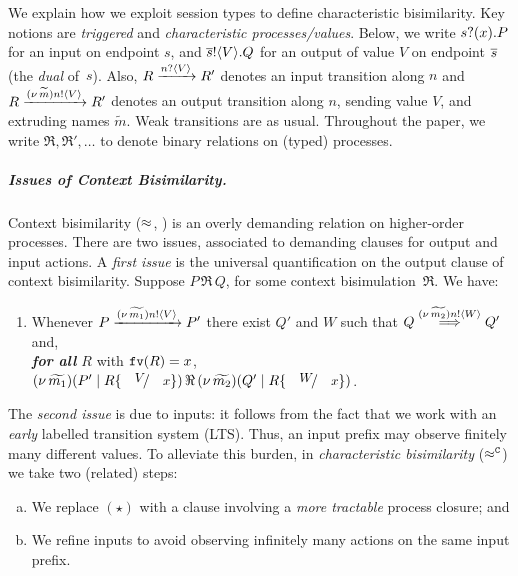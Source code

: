 \documentclass[a4paper,UKenglish]{lipics}
\theoremstyle{definition}
\begin{document}
\smallskip 
We explain how we exploit session types to 
define characteristic bisimilarity.
Key notions are \emph{triggered} and \emph{characteristic processes/values}.
Below, we 
write $s ? (x) .{P}$ 
for an input on %
endpoint $s$, 
and $\overline{s} ! \langle V \rangle . Q$
for an output of value $V$ 
on endpoint $\overline{s}$ (the \emph{dual} of~$s$).
Also, $R \xrightarrow{n ? \langle V \rangle} R'$ denotes an input transition along $n$
and
$R \xrightarrow{(\nu\, \widetilde{m}) n ! \langle V \rangle} R'$
denotes an output transition along $n$, 
sending value $V$, and extruding names $\widetilde{m}$. 
Weak transitions are as usual.
Throughout the paper, we write $\Re, \Re',\ldots$ to denote binary relations on (typed) processes.


\subparagraph{Issues of Context Bisimilarity.}
Context bisimilarity ($\approx$, ) is an overly demanding relation on higher-order processes. 
There are two issues, associated to demanding clauses for output and input actions. 
A \emph{first issue} %
is 
the universal quantification on the output clause of context bisimilarity.
Suppose $P \,\Re\, Q$, for some context bisimulation~$\Re$. We have:
\begin{enumerate}[$(\star)$]
	\item	Whenever 
		$P \xrightarrow{(\nu\, \widetilde{m_1}) n ! \langle V \rangle} P'$
		there exist
		$Q'$ and $W$
		such that 
		$Q \stackrel{(\nu\, \widetilde{m_2}) n ! \langle W \rangle}{\Longrightarrow} Q'$
		and, \\ \emph{\textbf{for all} $R$}  with $\mathtt{fv}(R)=x$, 
		$\newsp{\widetilde{m_1}}{P' \Par R\subst{V}{x}} \,\Re\, \newsp{\widetilde{m_2}}{Q' \Par R\subst{W}{x}}$.
\end{enumerate}

\noi The \emph{second issue} is due to inputs: it  
follows from 
the fact that we work with an \emph{early}
labelled transition system (LTS). Thus, %
an input prefix may observe
finitely many different values.
To alleviate this burden,
in %
\emph{characteristic
bisimilarity} ($\approx^\mathtt{C}$)
we take two (related) steps: 
\begin{enumerate}[(a)]
	\item We replace $(\star)$ with a clause involving a \emph{more tractable} process closure; and 
	\item We refine  inputs %
	to avoid observing infinitely many actions on the same input prefix.
\end{enumerate}
\end{document}
